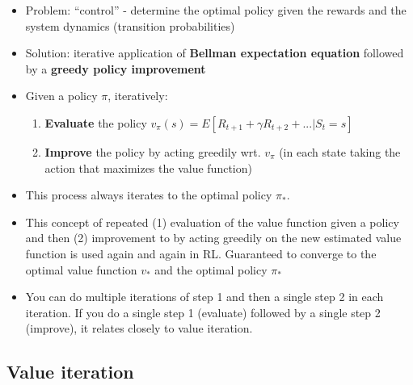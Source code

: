 \documentclass{article}
\begin{document}
\begin{itemize}
    \item Problem: ``control'' - determine the optimal policy given the rewards and the system dynamics (transition probabilities)
    \item Solution: iterative application of \textbf{Bellman expectation equation} followed by a \textbf{greedy policy improvement}
    \item Given a policy $\pi$, iteratively:
    \begin{enumerate}
        \item \textbf{Evaluate} the policy $v_\pi(s)=E[R_{t+1} + \gamma R_{t+2} + ... | S_t=s]$
        \item \textbf{Improve} the policy by acting greedily wrt. $v_\pi$ (in each state taking the action that maximizes the value function)
    \end{enumerate}
    \item This process always iterates to the optimal policy $\pi_*$. 
    \item This concept of repeated (1) evaluation of the value function given a policy and then (2) improvement to by acting greedily on the new estimated value function is used again and again in RL. Guaranteed to converge to the optimal value function $v_*$ and the optimal policy $\pi_*$
    \item You can do multiple iterations of step 1 and then a single step 2 in each iteration. If you do a single step 1 (evaluate) followed by a single step 2 (improve), it relates closely to value iteration.
\end{itemize}

\subsection{Value iteration}
\end{document}
